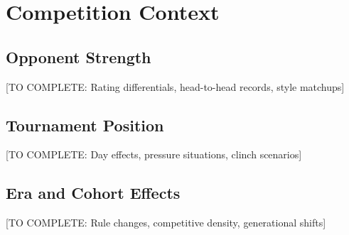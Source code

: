 \section{Competition Context}

\subsection{Opponent Strength}

[TO COMPLETE: Rating differentials, head-to-head records, style matchups]

\subsection{Tournament Position}

[TO COMPLETE: Day effects, pressure situations, clinch scenarios]

\subsection{Era and Cohort Effects}

[TO COMPLETE: Rule changes, competitive density, generational shifts]